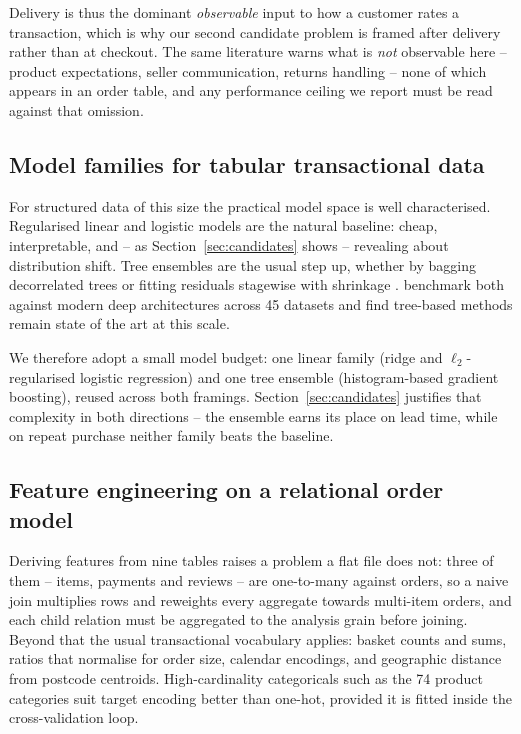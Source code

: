 Delivery is thus the dominant \emph{observable} input to how a customer rates a
transaction, which is why our second candidate problem is framed after delivery
rather than at checkout. The same literature warns what is \emph{not} observable
here -- product expectations, seller communication, returns handling -- none of
which appears in an order table, and any performance ceiling we report must be
read against that omission.

\subsection{Model families for tabular transactional data}

For structured data of this size the practical model space is well characterised.
Regularised linear and logistic models are the natural baseline: cheap,
interpretable, and -- as Section~\ref{sec:candidates} shows -- revealing about
distribution shift. Tree ensembles are the usual step up, whether by bagging
decorrelated trees \citep{breiman2001rf} or fitting residuals stagewise with
shrinkage \citep{friedman2001gbm, chen2016xgboost}. \citet{grinsztajn2022tabular}
benchmark both against modern deep architectures across 45 datasets and find
tree-based methods remain state of the art at this scale.

We therefore adopt a small model budget: one linear family (ridge and
$\ell_2$-regularised logistic regression) and one tree ensemble (histogram-based
gradient boosting), reused across both framings. Section~\ref{sec:candidates}
justifies that complexity in both directions -- the ensemble earns its place on
lead time, while on repeat purchase neither family beats the baseline.

\subsection{Feature engineering on a relational order model}

Deriving features from nine tables raises a problem a flat file does not: three
of them -- items, payments and reviews -- are one-to-many against orders, so a
naive join multiplies rows and reweights every aggregate towards multi-item
orders, and each child relation must be aggregated to the analysis grain before
joining. Beyond that the usual transactional vocabulary applies: basket counts and sums,
ratios that normalise for order size, calendar encodings, and geographic distance
from postcode centroids. High-cardinality categoricals such as the 74 product
categories suit target encoding \citep{miccibarreca2001target} better than
one-hot, provided it is fitted inside the cross-validation loop.

